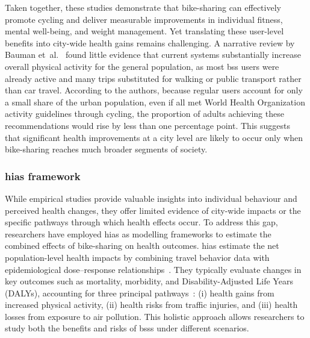     Taken together, these studies demonstrate that bike-sharing can effectively promote cycling and deliver measurable improvements in individual fitness, mental well-being, and weight management. Yet translating these user-level benefits into city-wide health gains remains challenging. A narrative review by Bauman et~al.~\cite{Bauman2017} found little evidence that current systems substantially increase overall physical activity for the general population, as most \ac{bss} users were already active and many trips substituted for walking or public transport rather than car travel. According to the authors, because regular users account for only a small share of the urban population, even if all met World Health Organization activity guidelines through cycling, the proportion of adults achieving these recommendations would rise by less than one percentage point. This suggests that significant health improvements at a city level are likely to occur only when bike-sharing reaches much broader segments of society.
        

    \subsubsection{\acp{hia} framework}

    While empirical studies provide valuable insights into individual behaviour and perceived health changes, they offer limited evidence of city-wide impacts or the specific pathways through which health effects occur. To address this gap, researchers have employed \acp{hia} as modelling frameworks to estimate the combined effects of bike-sharing on health outcomes. \acp{hia} estimate the net population-level health impacts by combining travel behavior data with epidemiological dose–response relationships~\cite{Rojas-Rueda2011, Woodcock2014, Otero2018, Clockston2021}. They typically evaluate changes in key outcomes such as mortality, morbidity, and Disability-Adjusted Life Years (DALYs), accounting for three principal pathways~\cite{Teixeira2021}: (i) health gains from increased physical activity, (ii) health risks from traffic injuries, and (iii) health losses from exposure to air pollution. This holistic approach allows researchers to study both the benefits and risks of \acp{bss} under different scenarios.

